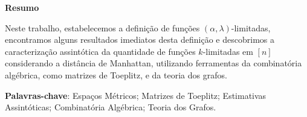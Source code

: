 \begin{center}
  \large \textbf{Resumo}
\end{center}
\vspace{1cm}
\par Neste trabalho, estabelecemos a definição de funções $(\alpha, \lambda)$-limitadas, encontramos alguns resultados imediatos desta definição e descobrimos a caracterização assintótica da quantidade de funções $k$-limitadas em $[n]$ considerando a distância de Manhattan, utilizando ferramentas da combinatória algébrica, como matrizes de Toeplitz, e da teoria dos grafos.

\vspace{1cm}

\begin{raggedleft}
  \textbf{Palavras-chave}: Espaços Métricos; Matrizes de Toeplitz; Estimativas Assintóticas; Combinatória Algébrica; Teoria dos Grafos.
\end{raggedleft}
\newpage
